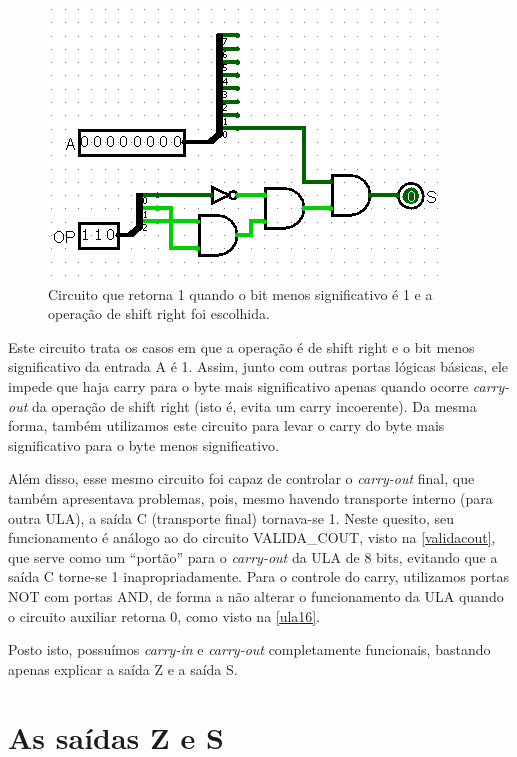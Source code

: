 \documentclass[
	12pt,				%
	openright,			%
	twoside,			%
	a4paper,			%
	english,			%
	french,				%
	spanish,			%
	brazil,				%
	]{abntex2}
\begin{document}
\begin{figure}[H]
	\begin{center}
	    \includegraphics[scale=0.6]{imagens/CARRY_SHR.png}
	\end{center}
\caption{\label{carry_shr}Circuito que retorna 1 quando o bit menos  significativo é 1 e a operação de shift right foi escolhida.}
\end{figure}

Este circuito trata os casos em que a operação é de shift right e o bit menos significativo da entrada A é 1. Assim, junto com outras portas lógicas básicas, ele impede que haja carry para o byte mais significativo apenas quando ocorre \textit{carry-out} da operação de shift right (isto é, evita um carry incoerente). Da mesma forma, também utilizamos este circuito para levar o carry do byte mais significativo para o byte menos significativo.

Além disso, esse mesmo circuito foi capaz de controlar o \textit{carry-out} final, que também apresentava problemas, pois, mesmo havendo transporte interno (para outra ULA), a saída C (transporte final) tornava-se 1. Neste quesito, seu funcionamento é análogo ao do circuito VALIDA\_COUT, visto na \autoref{validacout}, que serve como um ``portão'' para o \textit{carry-out} da ULA de 8 bits, evitando que a saída C torne-se 1 inapropriadamente. Para o controle do carry, utilizamos portas NOT com portas AND, de forma a não alterar o funcionamento da ULA quando o circuito auxiliar retorna 0, como visto na \autoref{ula16}.

Posto isto, possuímos \textit{carry-in} e \textit{carry-out} completamente funcionais, bastando apenas explicar a saída Z e a saída S.

\section{As saídas Z e S}
\end{document}

